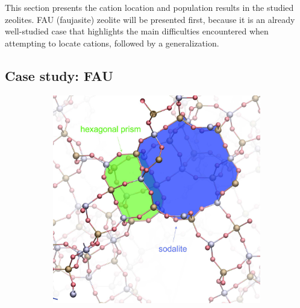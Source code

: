 \documentclass[main.tex]{subfiles}
\begin{document}
This section presents the cation location and population results in the studied zeolites. FAU (faujasite) zeolite will be presented first, because it is an already well-studied case \autocite{NaFaujasiteSimpleModel,Beauvais,CO2Faujasite,CationsFAUReview,FaujasiteCationLocalization} that highlights the main difficulties encountered when attempting to locate cations, followed by a generalization.

\subsection{Case study: FAU}

\label{casestudyFAU}

\begin{figure}
	\centering
	\hfill\begin{subfigure}{0.45\columnwidth}
		\centering
		\includegraphics[width=\columnwidth]{figures/cations/FAU1_cages_text.jpg}
		\label{fig:FAUdetail}
	\end{subfigure}\hfill%
	\begin{subfigure}{0.45\columnwidth}
		\centering

\end{subfigure}
\end{figure}
\end{document}
